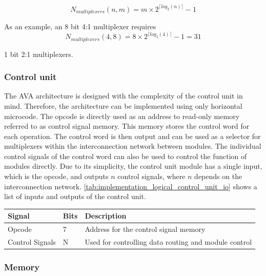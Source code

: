 \begin{displaymath}
    N_{multiplexers}(n, m) = m \times 2^{\lceil log_2(n) \rceil} - 1
\end{displaymath}

As an example, an 8 bit 4:1 multiplexer requires 
\begin{displaymath}
    N_{multiplexers}(4, 8) = 8 \times 2^{\lceil log_2(4) \rceil} - 1 = 31
\end{displaymath}

1 bit 2:1 multiplexers.


\subsubsection{Control unit}

The AVA architecture is designed with the complexity of the control unit in mind. Therefore, the architecture can be implemented using only horizontal microcode. The opcode is directly used as an address to read-only memory referred to as control signal memory. This memory stores the control word for each operation. The control word is then output and can be used as a selector for multiplexers within the interconnection network between modules. The individual control signals of the control word can also be used to control the function of modules directly. Due to its simplicity, the control unit module has a single input, which is the opcode, and outputs $n$ control signals, where $n$ depends on the interconnection network. \autoref{tab:implementation_logical_control_unit_io} shows a list of inputs and outputs of the control unit.

\begin{table}[H]
    \centering
    \begin{tabular}{|l|l|l|} 
    \hline
    \textbf{\textbf{Signal}} & \textbf{Bits} & \textbf{Description}                                  \\ 
    \hline
    Opcode                   & 7             & Address for the control signal memory                 \\ 
    \hline
    Control Signals          & N             & Used for controlling data routing and module control  \\
    \hline
    \end{tabular}
    \label{tab:implementation_logical_control_unit_io}
\end{table}

\subsubsection{Memory}

